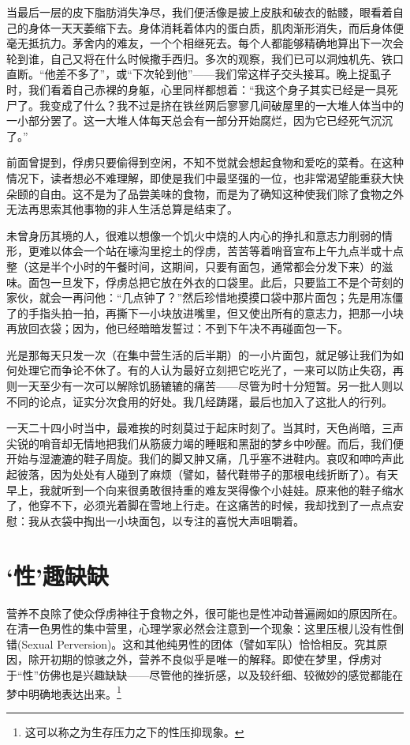 \documentclass[11pt,oneside]{book}
\begin{document}
\begin{common-format}
当最后一层的皮下脂肪消失净尽，我们便活像是披上皮肤和破衣的骷髅，眼看着自己的身体一天天萎缩下去。身体消耗着体内的蛋白质，肌肉渐形消失，而后身体便毫无抵抗力。茅舍内的难友，一个个相继死去。每个人都能够精确地算出下一次会轮到谁，自己又将在什么时候撒手西归。多次的观察，我们已可以洞烛机先、铁口直断。“他差不多了”，或“下次轮到他”——我们常这样子交头接耳。晚上捉虱子时，我们看着自己赤裸的身躯，心里同样都想着：“我这个身子其实已经是一具死尸了。我变成了什么？我不过是挤在铁丝网后寥寥几间破屋里的一大堆人体当中的一小部分罢了。这一大堆人体每天总会有一部分开始腐烂，因为它已经死气沉沉了。”

前面曾提到，俘虏只要偷得到空闲，不知不觉就会想起食物和爱吃的菜肴。在这种情况下，读者想必不难理解，即使是我们中最坚强的一位，也非常渴望能重获大快朵颐的自由。这不是为了品尝美味的食物，而是为了确知这种使我们除了食物之外无法再思索其他事物的非人生活总算是结束了。

未曾身历其境的人，很难以想像一个饥火中烧的人内心的挣扎和意志力削弱的情形，更难以体会一个站在壕沟里挖土的俘虏，苦苦等着哨音宣布上午九点半或十点整（这是半个小时的午餐时间，这期间，只要有面包，通常都会分发下来）的滋味。面包一旦发下，俘虏总把它放在外衣的口袋里。此后，只要监工不是个苛刻的家伙，就会一再问他：“几点钟了？”然后珍惜地摸摸口袋中那片面包；先是用冻僵了的手指头拍一拍，再撕下一小块放进嘴里，但又使出所有的意志力，把那一小块再放回衣袋；因为，他已经暗暗发誓过：不到下午决不再碰面包一下。

光是那每天只发一次（在集中营生活的后半期）的一小片面包，就足够让我们为如何处理它而争论不休了。有的人认为最好立刻把它吃光了，一来可以防止失窃，再则一天至少有一次可以解除饥肠辘辘的痛苦——尽管为时十分短暂。另一批人则以不同的论点，证实分次食用的好处。我几经踌躇，最后也加入了这批人的行列。

一天二十四小时当中，最难挨的时刻莫过于起床时刻了。当其时，天色尚暗，三声尖锐的哨音却无情地把我们从筋疲力竭的睡眠和黑甜的梦乡中吵醒。而后，我们便开始与湿漉漉的鞋子周旋。我们的脚又肿又痛，几乎塞不进鞋内。哀叹和呻吟声此起彼落，因为处处有人碰到了麻烦（譬如，替代鞋带子的那根电线折断了）。有天早上，我就听到一个向来很勇敢很持重的难友哭得像个小娃娃。原来他的鞋子缩水了，他穿不下，必须光着脚在雪地上行走。在这痛苦的时候，我却找到了一点点安慰：我从衣袋中掏出一小块面包，以专注的喜悦大声咀嚼着。


\section{‘性’趣缺缺}
营养不良除了使众俘虏神往于食物之外，很可能也是性冲动普遍阙如的原因所在。在清一色男性的集中营里，心理学家必然会注意到一个现象：这里压根儿没有性倒错(Sexual Perversion)。这和其他纯男性的团体（譬如军队）恰恰相反。究其原因，除开初期的惊骇之外，营养不良似乎是唯一的解释。即使在梦里，俘虏对于“性”仿佛也是兴趣缺缺——尽管他的挫折感，以及较纤细、较微妙的感觉都能在梦中明确地表达出来。\footnote{这可以称之为生存压力之下的性压抑现象。}


\end{common-format}
\end{document}
